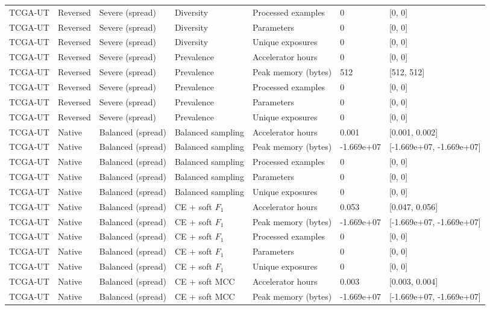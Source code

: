 \begin{longtable}{lllllll}
TCGA-UT & Reversed & Severe (spread) & Diversity & Processed examples & 0 & [0, 0] \\
TCGA-UT & Reversed & Severe (spread) & Diversity & Parameters & 0 & [0, 0] \\
TCGA-UT & Reversed & Severe (spread) & Diversity & Unique exposures & 0 & [0, 0] \\
TCGA-UT & Reversed & Severe (spread) & Prevalence & Accelerator hours & 0 & [0, 0] \\
TCGA-UT & Reversed & Severe (spread) & Prevalence & Peak memory (bytes) & 512 & [512, 512] \\
TCGA-UT & Reversed & Severe (spread) & Prevalence & Processed examples & 0 & [0, 0] \\
TCGA-UT & Reversed & Severe (spread) & Prevalence & Parameters & 0 & [0, 0] \\
TCGA-UT & Reversed & Severe (spread) & Prevalence & Unique exposures & 0 & [0, 0] \\
TCGA-UT & Native & Balanced (spread) & Balanced sampling & Accelerator hours & 0.001 & [0.001, 0.002] \\
TCGA-UT & Native & Balanced (spread) & Balanced sampling & Peak memory (bytes) & -1.669e+07 & [-1.669e+07, -1.669e+07] \\
TCGA-UT & Native & Balanced (spread) & Balanced sampling & Processed examples & 0 & [0, 0] \\
TCGA-UT & Native & Balanced (spread) & Balanced sampling & Parameters & 0 & [0, 0] \\
TCGA-UT & Native & Balanced (spread) & Balanced sampling & Unique exposures & 0 & [0, 0] \\
TCGA-UT & Native & Balanced (spread) & CE + soft $F_1$ & Accelerator hours & 0.053 & [0.047, 0.056] \\
TCGA-UT & Native & Balanced (spread) & CE + soft $F_1$ & Peak memory (bytes) & -1.669e+07 & [-1.669e+07, -1.669e+07] \\
TCGA-UT & Native & Balanced (spread) & CE + soft $F_1$ & Processed examples & 0 & [0, 0] \\
TCGA-UT & Native & Balanced (spread) & CE + soft $F_1$ & Parameters & 0 & [0, 0] \\
TCGA-UT & Native & Balanced (spread) & CE + soft $F_1$ & Unique exposures & 0 & [0, 0] \\
TCGA-UT & Native & Balanced (spread) & CE + soft MCC & Accelerator hours & 0.003 & [0.003, 0.004] \\
TCGA-UT & Native & Balanced (spread) & CE + soft MCC & Peak memory (bytes) & -1.669e+07 & [-1.669e+07, -1.669e+07] \\

\end{longtable}
